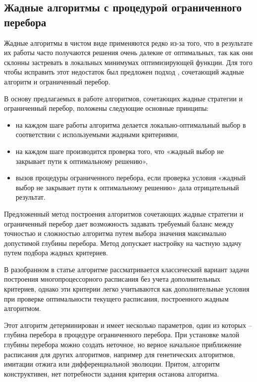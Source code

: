 \subsection{Жадные алгоритмы с процедурой ограниченного перебора}

Жадные алгоритмы в чистом  виде применяются редко из-за того, что в результате их работы часто получаются решения очень далекие от оптимальных, так как они склонны застревать в локальных минимумах оптимизирующей функции. Для того чтобы исправить этот недостаток был предложен подход \cite{Kostenko_2017}, сочетающий жадные алгоритм и ограниченный перебор.

В основу предлагаемых в работе алгоритмов, сочетающих жадные стратегии и ограниченный перебор, положены следующие основные принципы:
\begin{itemize}
    \item на каждом шаге работы алгоритма делается локально-оптимальный выбор в соответствии с используемыми жадными критериями,
    \item на каждом шаге производится проверка того, что «жадный выбор не закрывает пути к оптимальному решению»,
    \item вызов процедуры ограниченного перебора, если проверка условия «жадный выбор не закрывает пути к оптимальному решению» дала отрицательный результат.
\end{itemize}
Предложенный метод построения алгоритмов сочетающих жадные стратегии и ограниченный перебор дает возможность задавать требуемый баланс между точностью и сложностью алгоритма путем выбора значения максимально допустимой глубины перебора. Метод допускает настройку на частную задачу путем подбора жадных критериев.

В разобранном в статье \cite{Kostenko_2017} алгоритме рассматривается классический вариант задачи построения многопроцессорного расписания без учета дополнительных критериев, однако эти критерии легко учитываются как дополнительные условия при проверке оптимальности текущего расписания, построенного жадным алгоритмом.

Этот алгоритм детерминирован и имеет несколько параметров, один из которых – глубина перебора в процедуре ограниченного перебора. При установке малой глубины перебора можно создать неточное, но верное начальное приближение расписания для других алгоритмов, например для генетических алгоритмов, имитации отжига или дифференциальной эволюции. Притом, алгоритм конструктивен, нет потребности задания критерия останова алгоритма.

